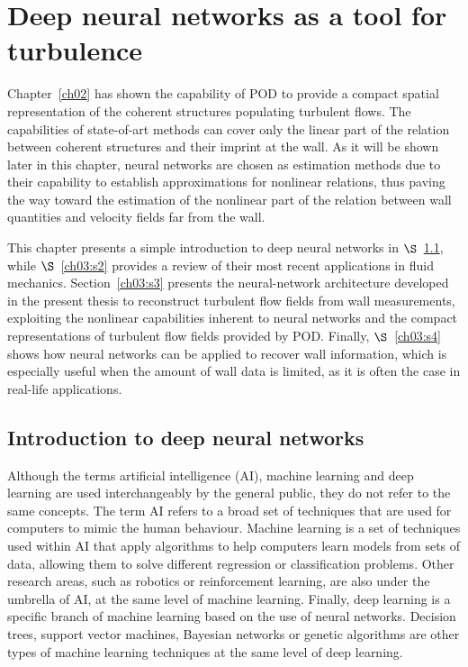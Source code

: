 \chapter{Deep neural networks as a tool for turbulence}\label{ch03}
%
Chapter~\ref{ch02} has shown the capability of POD to provide a compact spatial representation of the coherent structures populating turbulent flows.
The capabilities of state-of-art methods can cover only the linear part of the relation between coherent structures and their imprint at the wall.
As it will be shown later in this chapter, neural networks are chosen as estimation methods due to their capability to establish approximations for nonlinear relations, thus paving the way toward the estimation of the nonlinear part of the relation between wall quantities and velocity fields far from the wall.

This chapter presents a simple introduction to deep neural networks in $\S$~\ref{ch03:s1}, while $\S$~\ref{ch03:s2} provides a review of their most recent applications in fluid mechanics.
Section~\ref{ch03:s3} presents the neural-network architecture developed in the present thesis to reconstruct turbulent flow fields from wall measurements, exploiting the nonlinear capabilities inherent to neural networks and the compact representations of turbulent flow fields provided by POD.
Finally, $\S$~\ref{ch03:s4} shows how neural networks can be applied to recover wall information, which is especially useful when the amount of wall data is limited, as it is often the case in real-life applications.

\section{Introduction to deep neural networks}\label{ch03:s1}

Although the terms artificial intelligence (AI), machine learning and deep learning are used interchangeably by the general public, they do not refer to the same concepts.
The term AI refers to a broad set of techniques that are used for computers to mimic the human behaviour.
Machine learning is a set of techniques used within AI that apply algorithms to help computers learn models from sets of data, allowing them to solve different regression or classification problems.
Other research areas, such as robotics or reinforcement learning, are also under the umbrella of AI, at the same level of machine learning.
Finally, deep learning is a specific branch of machine learning based on the use of neural networks.
Decision trees, support vector machines, Bayesian networks or genetic algorithms are other types of machine learning techniques at the same level of deep learning.


